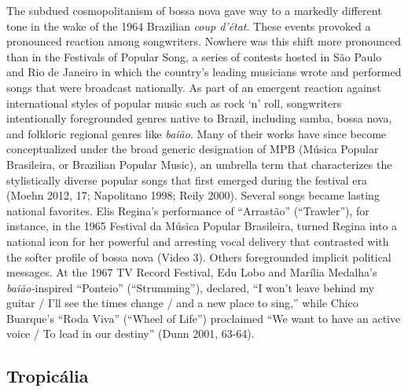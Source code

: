 \documentclass[twoside]{article}
\begin{document}
The subdued cosmopolitanism of bossa nova gave way to a markedly
different tone in the wake of the 1964 Brazilian \emph{coup d'état}.
These events provoked a pronounced reaction among songwriters\emph{.}
Nowhere was this shift more pronounced than in the Festivals of Popular
Song, a series of contests hosted in São Paulo and Rio de Janeiro in
which the country's leading musicians wrote and performed songs that
were broadcast nationally. As part of an emergent reaction against
international styles of popular music such as rock `n' roll, songwriters
intentionally foregrounded genres native to Brazil, including samba,
bossa nova, and folkloric regional genres like \emph{baião}. Many of
their works have since become conceptualized under the broad generic
designation of MPB (Música Popular Brasileira, or Brazilian Popular
Music), an umbrella term that characterizes the stylistically diverse
popular songs that first emerged during the festival era (Moehn 2012,
17; Napolitano 1998; Reily 2000). Several songs became lasting national
favorites. Elis Regina's performance of ``Arrastão'' (``Trawler''), for
instance, in the 1965 Festival da Música Popular Brasileira, turned
Regina into a national icon for her powerful and arresting vocal
delivery that contrasted with the softer profile of bossa nova (Video
3). Others foregrounded implicit political messages. At the 1967 TV
Record Festival, Edu Lobo and Marília Medalha's \emph{baião-}inspired
``Ponteio'' (``Strumming''), declared, ``I won't leave behind my guitar
/ I'll see the times change / and a new place to sing,'' while Chico
Buarque's ``Roda Viva'' (``Wheel of Life'') proclaimed ``We want to have
an active voice / To lead in our destiny'' (Dunn 2001, 63-64).

\hypertarget{tropicuxe1lia}{%
\subsection*{Tropicália}\label{tropicuxe1lia}}
\end{document}
